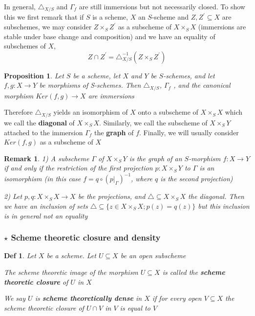 \documentclass{article}
\newtheorem{definition}[theorem]{Def}
\newtheorem{proposition}[theorem]{Proposition}
\newtheorem{remark}[theorem]{Remark}
\begin{document}
In general, $\triangle_{X/S}$ and $\Gamma_f$ are still immersions but not necessarily closed. To show this
we first remark that if $S$ is a scheme, $X$ an $S$-scheme and $Z, Z^\prime \subseteq X$ are subschemes,
we may consider $Z \times_S Z^\prime$ as a subscheme of $X \times_S X$ (immersions are stable under base
change and composition) and we have an equality of subschemes of $X$,
$$
Z\cap Z^\prime = \triangle_{X/S}^{-1} ({Z\times_SZ^\prime})
$$

\begin{proposition}
Let $S$ be a scheme, let $X$ and $Y$ be $S$-schemes, and let $f,g : X \to Y$ be
morphisms of S-schemes. Then $\triangle_{X/S}$, $\Gamma_f$ , and the canonical morphism $Ker(f,g) \to X$
are immersions
\end{proposition}

Therefore $\triangle_{X/S}$ yields an isomorphism of $X$ onto a subscheme of $X \times_S X$ which we
call the \textbf{diagonal} of $X \times_S X$. Similarly, we call the subscheme of $X \times_S Y$ attached to the
immersion $\Gamma_f$ the \textbf{graph} of $f$. Finally, we will usually consider $Ker(f,g)$ as a subscheme
of $X$

\begin{remark}
1) A subscheme $\Gamma$ of $X \times_S Y$ is the graph of an $S$-morphism $f : X \to Y$ if and only if
the restriction of the first projection $p: X \times_S Y$ to $\Gamma$ is an isomorphism (in this case
$f = q \circ (p|_\Gamma)^{-1}$, where $q$ is the second projection)

2) Let $p, q : X \times_S X \to X$ be the projections, and $\triangle \subseteq X \times_S X$ the diagonal. Then we
have an inclusion of sets $\triangle \subseteq \{ z \in X \times_S X ; p(z) = q(z) \}$ but this inclusion is in
general not an equality
\end{remark}

\subsubsection{$\star$ Scheme theoretic closure and density}

\begin{definition}
    Let $X$ be a scheme. Let $U \subseteq X$ be an open subscheme

The scheme theoretic image of the morphism $U \subseteq X$ is called the \textbf{scheme theoretic closure} of $U$ in $X$

We say $U$ is \textbf{scheme theoretically dense} in $X$ if for every open $V \subseteq X$ the scheme theoretic closure of $U\cap V$ in $V$ is equal to $V$
\end{definition}
\end{document}
